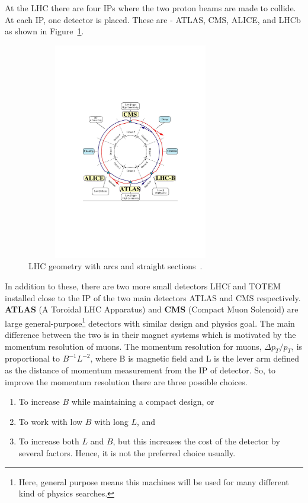 At the LHC there are four IPs where the two proton beams are made to collide. At each IP, one detector is placed. These are - ATLAS, CMS, ALICE, and LHCb as shown in Figure~\ref{fig:LHCgeometry}.
\begin{figure}[!htbp]
	\centering
	\includegraphics[width=0.81\textwidth,height=9.5cm]{figures/LHC/lhc-schematic.pdf}
	\caption{LHC geometry with arcs and straight sections~\cite{CERN}.}
	\label{fig:LHCgeometry}
\end{figure}
In addition to these, there are two more small detectors LHCf and TOTEM installed close to the IP of the two main detectors ATLAS and CMS respectively.\\
{\textbf{ATLAS}} (A Toroidal LHC Apparatus) and {\textbf{CMS}} (Compact Muon Solenoid) are large general-purpose\footnote{Here, general purpose means this machines will be used for many different kind of physics searches.} detectors with similar design and physics goal. 
The main difference between the two is in their magnet systems which is motivated by the momentum resolution of muons. 
The momentum resolution for muons, $\Delta p_T/p_T$, is proportional to  $B^{-1}L^{-2}$, where B is magnetic field and L is the lever arm defined as the distance of momentum measurement from the IP of detector. 
So, to improve the momentum resolution there are three possible choices.

\begin{enumerate}
	\item To increase $B$ while maintaining a compact design, or
	\item To work with low $B$ with long $L$, and
	\item To increase both $L$ and $B$, but this increases the cost of the detector by several factors. Hence, it is not the preferred choice usually.
\end{enumerate}

